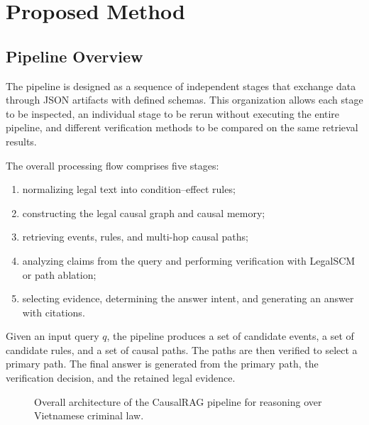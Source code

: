 \section{Proposed Method}
\label{sec:method}

\subsection{Pipeline Overview}

The pipeline is designed as a sequence of independent stages that exchange
data through JSON artifacts with defined schemas. This organization allows
each stage to be inspected, an individual stage to be rerun without
executing the entire pipeline, and different verification methods to be
compared on the same retrieval results.

The overall processing flow comprises five stages:

\begin{enumerate}
    \item normalizing legal text into condition--effect rules;

    \item constructing the legal causal graph and causal memory;

    \item retrieving events, rules, and multi-hop causal paths;

    \item analyzing claims from the query and performing verification with
    LegalSCM or path ablation;

    \item selecting evidence, determining the answer intent, and generating
    an answer with citations.
\end{enumerate}

Given an input query \(q\), the pipeline produces a set of candidate events,
a set of candidate rules, and a set of causal paths. The paths are then
verified to select a primary path. The final answer is generated from the
primary path, the verification decision, and the retained legal evidence.

\begin{figure}[t]
    \centering
    \caption{Overall architecture of the CausalRAG pipeline for reasoning
    over Vietnamese criminal law.}
    \label{fig:pipeline}
\end{figure}

